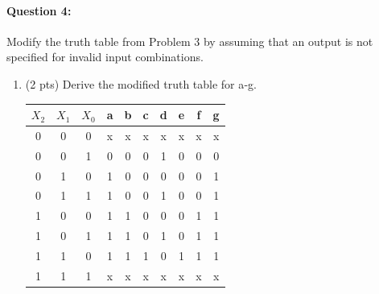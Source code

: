 \documentclass[12pt,letterpaper,titlepage]{report}
\begin{document}
\begin{raggedright}
\begin{enumerate} [label=\alph*)]
\end{enumerate}
\pagebreak

\paragraph{Question 4:}
Modify the truth table from Problem 3 by assuming that an output is not specified for invalid input combinations. 
\begin{enumerate} [label=\alph*)]
\item (2 pts) Derive the modified truth table for a‐g.
\begin{center}
\begin{tabular}{|c c c| c c c c c c c |}\hline
$X_2$ & $X_1$ & $X_0$ & a & b & c & d & e & f & g \\\hline
            0 & 0 & 0 & x & x & x & x & x & x & x \\\hline
            0 & 0 & 1 & 0 & 0 & 0 & 1 & 0 & 0 & 0 \\\hline
            0 & 1 & 0 & 1 & 0 & 0 & 0 & 0 & 0 & 1 \\\hline
            0 & 1 & 1 & 1 & 0 & 0 & 1 & 0 & 0 & 1 \\\hline
            1 & 0 & 0 & 1 & 1 & 0 & 0 & 0 & 1 & 1 \\\hline
            1 & 0 & 1 & 1 & 1 & 0 & 1 & 0 & 1 & 1 \\\hline
            1 & 1 & 0 & 1 & 1 & 1 & 0 & 1 & 1 & 1 \\\hline
            1 & 1 & 1 & x & x & x & x & x & x & x \\\hline
\end{tabular}
\end{center}
 

\end{enumerate}
\end{raggedright}
\end{document}
